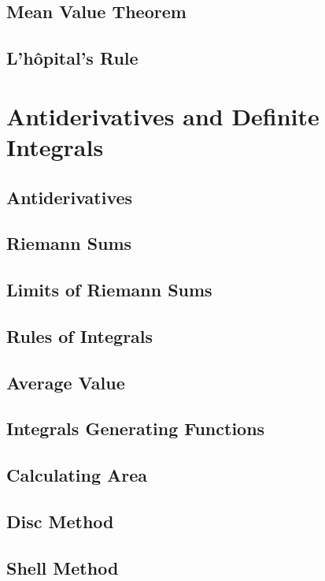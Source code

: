 \documentclass{article}
\begin{document}
\subsection{Mean Value Theorem}
\subsection{L'h\^{o}pital's Rule}
\newpage
\section{Antiderivatives and Definite Integrals}
\subsection{Antiderivatives}
\subsection{Riemann Sums}
\subsection{Limits of Riemann Sums}
\subsection{Rules of Integrals}
\subsection{Average Value}
\subsection{Integrals Generating Functions}
\subsection{Calculating Area}
\subsection{Disc Method}
\subsection{Shell Method}
\newpage
\end{document}

